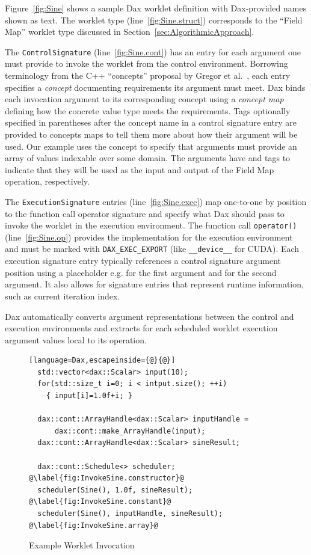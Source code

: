 \documentclass[conference]{IEEEtran}
\newcommand*{\scite}[1]{~\cite{#1}}
\newcommand{\etal}{et al.}
\newcommand{\Ci}[1]{\color{blue}{#1}} %
\newcommand{\CiDesc}{\Ci{Blue}}
\newcommand{\Code}[1]{{\small\texttt{#1}}}
\begin{document}
Figure~\ref{fig:Sine} shows a sample Dax worklet definition with
Dax-provided names shown as \Code{\CiDesc} text.
%
The worklet type \Code{\Ci{WorkletMapField}}
(line~\ref{fig:Sine.struct}) corresponds to the ``Field Map'' worklet
type discussed in Section~\ref{sec:AlgorithmicApproach}.

The \Code{ControlSignature} (line~\ref{fig:Sine.cont}) has an entry
for each argument one must provide to invoke the worklet from the
control environment.
%
Borrowing terminology from the C++ ``concepts'' proposal by Gregor
\etal\scite{Gregor2006}, each entry specifies a \emph{concept}
documenting requirements its argument must meet.
%
Dax binds each invocation argument to its corresponding concept using
a \emph{concept map} defining how the concrete value type meets the
requirements.
%
Tags optionally specified in parentheses after the concept name in a
control signature entry are provided to concepts maps to tell them
more about how their argument will be used.
%
Our example uses the \Code{\Ci{Field}} concept to specify that
arguments must provide an array of values indexable over some domain.
%
The arguments have \Code{\Ci{In}} and \Code{\Ci{Out}} tags to indicate
that they will be used as the input and output of the Field Map
operation, respectively.

The \Code{ExecutionSignature} entries (line~\ref{fig:Sine.exec}) map
one-to-one by position to the function call operator signature and
specify what Dax should pass to invoke the worklet in the execution
environment.
%
The function call \Code{operator()} (line~\ref{fig:Sine.op}) provides
the implementation for the execution environment and must be marked
with \Code{DAX\_EXEC\_EXPORT} (like \Code{\_\_device\_\_} for CUDA).
%
Each execution signature entry typically references a control
signature argument position using a placeholder e.g. \Code{\Ci{\_1}}
for the first argument and \Code{\Ci{\_2}} for the second argument.
It also allows for signature entries that represent runtime information,
such as current iteration index.


Dax automatically converts argument representations between the
control and execution environments and extracts for each scheduled
worklet execution argument values local to its operation.

\begin{figure}[ht]
  \centering
  \begin{lstlisting}[language=Dax,escapeinside={@}{@}]
  std::vector<dax::Scalar> input(10);
  for(std::size_t i=0; i < intput.size(); ++i)
    { input[i]=1.0f+i; }

  dax::cont::ArrayHandle<dax::Scalar> inputHandle =
      dax::cont::make_ArrayHandle(input);
  dax::cont::ArrayHandle<dax::Scalar> sineResult;

  dax::cont::Schedule<> scheduler; @\label{fig:InvokeSine.constructor}@
  scheduler(Sine(), 1.0f, sineResult); @\label{fig:InvokeSine.constant}@
  scheduler(Sine(), inputHandle, sineResult); @\label{fig:InvokeSine.array}@
  \end{lstlisting}
  \caption{Example Worklet Invocation}
  \label{fig:InvokeSine}
\end{figure}
\end{document}
